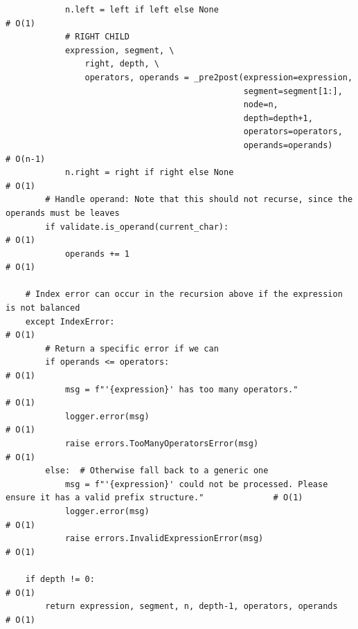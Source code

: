 \documentclass[10pt,letterpaper,final]{report}
\begin{document}
\begin{verbatim}
            n.left = left if left else None                                                                             # O(1)
            # RIGHT CHILD
            expression, segment, \
                right, depth, \
                operators, operands = _pre2post(expression=expression,
                                                segment=segment[1:],
                                                node=n,
                                                depth=depth+1,
                                                operators=operators,
                                                operands=operands)                                                      # O(n-1)
            n.right = right if right else None                                                                          # O(1)
        # Handle operand: Note that this should not recurse, since the operands must be leaves
        if validate.is_operand(current_char):                                                                           # O(1)
            operands += 1                                                                                               # O(1)

    # Index error can occur in the recursion above if the expression is not balanced
    except IndexError:                                                                                                  # O(1)
        # Return a specific error if we can
        if operands <= operators:                                                                                       # O(1)
            msg = f"'{expression}' has too many operators."                                                             # O(1)
            logger.error(msg)                                                                                           # O(1)
            raise errors.TooManyOperatorsError(msg)                                                                     # O(1)
        else:  # Otherwise fall back to a generic one
            msg = f"'{expression}' could not be processed. Please ensure it has a valid prefix structure."              # O(1)
            logger.error(msg)                                                                                           # O(1)
            raise errors.InvalidExpressionError(msg)                                                                    # O(1)

    if depth != 0:                                                                                                      # O(1)
        return expression, segment, n, depth-1, operators, operands                                                     # O(1)


\end{verbatim}
\end{document}
